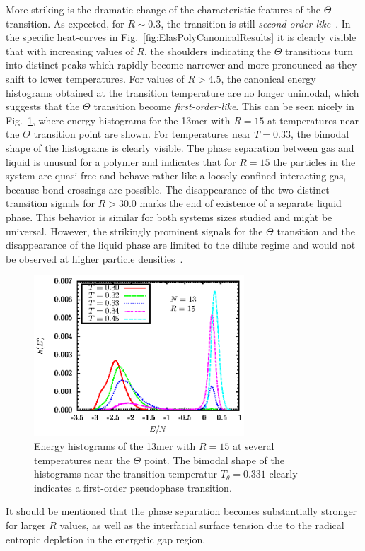 \documentclass[12pt]{report}
\begin{document}
More striking is the dramatic change of the characteristic features of the $\Theta$ transition. As expected, for $R \sim 0.3$, the transition is still \emph{second-order-like}~\cite{Lifshitz1978,Khokhlov1981}. In the specific heat-curves in Fig.~\ref{fig:ElasPolyCanonicalResults} it is clearly visible that with increasing values of $R$, the shoulders indicating the $\Theta$ transitions turn into distinct peaks which rapidly become narrower and more pronounced as they shift to lower temperatures. For values of  $R > 4.5$, the canonical energy histograms obtained at the transition temperature are no longer unimodal, which suggests that the $\Theta$ transition become \emph{first-order-like}. This can be seen nicely in  Fig.~\ref{fig:ElasPolyhist13}, where energy histograms for the 13mer with $R=15$ at temperatures near the $\Theta$ transition point are shown. For temperatures near $T=0.33$, the bimodal shape of the histograms is clearly visible. The phase separation between gas and liquid is unusual for a polymer and indicates that for $R=15$ the particles in the system are quasi-free and behave rather like a loosely confined interacting gas, because bond-crossings are possible. The disappearance of the two distinct transition signals for $R > 30.0$ marks the end of existence of a separate liquid phase. This behavior is similar for both systems sizes studied and might be universal. However, the strikingly prominent signals for the $\Theta$ transition and the disappearance of the liquid phase are limited to the dilute regime and would not be observed at higher particle densities~\cite{frantz,frant2}. 
%
\begin{figure}
\center
\includegraphics[width = 0.7\textwidth]{chapter5Figs/hist13.eps}
\caption{\label{fig:ElasPolyhist13}%
Energy histograms of the 13mer with $R=15$ at several temperatures near the $\Theta$ point. The bimodal shape of the histograms near the transition temperatur $T_{\theta } = 0.331$ clearly indicates a first-order pseudophase transition.}
\end{figure}
%
It should be mentioned that the phase separation becomes substantially stronger for larger $R$ values, as well as the interfacial surface tension due to the radical entropic depletion in the energetic gap region.
\end{document}
